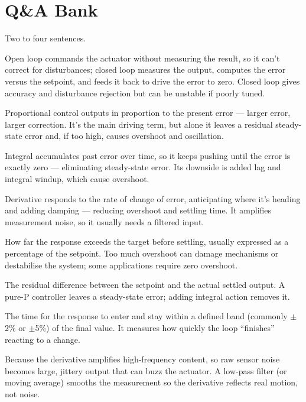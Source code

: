 \section{Q\&A Bank}

%
{Two to four sentences.}

Open loop commands the actuator without measuring the result, so it can't
correct for disturbances; closed loop measures the output, computes the error
versus the setpoint, and feeds it back to drive the error to zero. Closed loop
gives accuracy and disturbance rejection but can be unstable if poorly tuned.

Proportional control outputs in proportion to the present error --- larger
error, larger correction. It's the main driving term, but alone it leaves a
residual steady-state error and, if too high, causes overshoot and oscillation.

Integral accumulates past error over time, so it keeps pushing until the error
is exactly zero --- eliminating steady-state error. Its downside is added lag and
integral windup, which cause overshoot.

Derivative responds to the rate of change of error, anticipating where it's
heading and adding damping --- reducing overshoot and settling time. It amplifies
measurement noise, so it usually needs a filtered input.

How far the response exceeds the target before settling, usually expressed as a
percentage of the setpoint. Too much overshoot can damage mechanisms or
destabilise the system; some applications require zero overshoot.

The residual difference between the setpoint and the actual settled output. A
pure-P controller leaves a steady-state error; adding integral action removes
it.

The time for the response to enter and stay within a defined band (commonly
$\pm$2\% or $\pm$5\%) of the final value. It measures how quickly the loop
``finishes'' reacting to a change.

Because the derivative amplifies high-frequency content, so raw sensor noise
becomes large, jittery output that can buzz the actuator. A low-pass filter (or
moving average) smooths the measurement so the derivative reflects real motion,
not noise.

